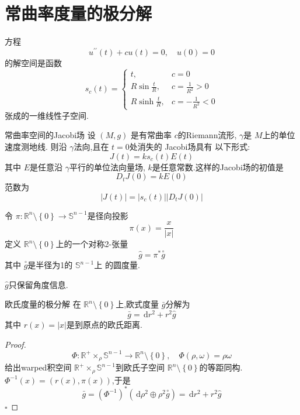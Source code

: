 \documentclass[../../main.tex]{subfiles}
\begin{document}
\section{常曲率度量的极分解}

\begin{lemma}
    方程 \[
    u^{\prime \prime} \left( t \right)+ c u\left( t \right)= 0,\quad u\left( 0 \right)= 0   
    \]的解空间是函数
    \[
    s_{c}\left( t \right)= \begin{cases} t,&c= 0\\ 
     R\sin \frac{t }{R },& c =  \frac{1 }{R^{2} }> 0\\ 
      R\sinh  \frac{t }{R },&c =-\frac{1 }{R^{2} }< 0     \end{cases}  
    \]张成的一维线性子空间.
\end{lemma}

\begin{proposition}{常曲率空间的Jacobi场}
    设 \(  \left( M,g \right)   \) 是有常曲率 \(  c  \)的Riemann流形, \(   \gamma   \)是 \(  M  \)上的单位速度测地线.   则沿 \(   \gamma   \)法向,且在 \(  t= 0  \)处消失的 Jacobi场具有 以下形式: \[
    J\left( t \right)= k s_{c}\left( t \right)  E\left( t \right) 
    \]其中 \(  E  \)是任意沿 \(   \gamma   \)平行的单位法向量场, \(  k  \)是任意常数.这样的Jacobi场的初值是 \[
    D_{t}J\left( 0 \right)= kE\left( 0 \right)  
    \]范数为 \[
    \left| J\left( t \right)  \right|= \left| s_{c}\left( t \right)  \right|\left| D_{t}J\left( 0 \right)  \right|   
    \]   
\end{proposition}
\begin{definition}
    令 \(  \pi : \mathbb{R} ^{n}\setminus \left\{ 0 \right\}\to \mathbb{S}^{n-1}  \)是径向投影 \[
    \pi \left( x \right)= \frac{x }{\left| x \right|  }  
    \] 定义 \(  \mathbb{R} ^{n}\setminus \left\{ 0 \right\}  \)上的一个对称2-张量 \[
    \hat{g}= \pi ^{*}\overset{\scriptstyle\circ}{g}
    \] 其中 \(  \overset{\scriptstyle\circ}{g}  \)是半径为1的 \(  \mathbb{S}^{n-1}  \)上 的圆度量. 
\end{definition}
\begin{note}
     \(  \hat{g}  \)只保留角度信息. 
\end{note}

\begin{lemma}{欧氏度量的极分解}
    在 \(  \mathbb{R} ^{n}\setminus \left\{ 0 \right\}  \)上,欧式度量 \(  \bar{g}  \)分解为 \[
    \bar{g}= \,\mathrm{d} r^{2}+ r^{2} \hat{g}
    \]其中 \(  r\left( x \right)= \left| x \right|    \)是到原点的欧氏距离.   
\end{lemma}
\begin{proof}
    \[
    \Phi :\mathbb{R} ^{+ }\times _{\rho }\mathbb{S}^{n-1}\to \mathbb{R} ^{n}\setminus \left\{ 0 \right\},\quad \Phi \left( \rho , \omega  \right)= \rho  \omega  
    \]给出warped积空间 \(  \mathbb{R} ^{+ }\times _{\rho }\mathbb{S}^{n-1}  \)到欧氏子空间 \(  \mathbb{R} ^{n}\setminus \left\{ 0 \right\}  \)的等距同构. \(  \Phi ^{-1} \left( x \right)= \left( r\left( x \right),\pi \left( x \right)   \right)    \),于是 \[
    \bar{g}= \left( \Phi ^{-1}  \right)^{*}\left( \,\mathrm{d} \rho ^{2}\oplus \rho ^{2}\overset{\scriptstyle\circ}{g} \right)= \,\mathrm{d} r^{2}+ r^{2}\hat{g}  
    \]   
    \hfill $\square$
\end{proof}
\end{document}
